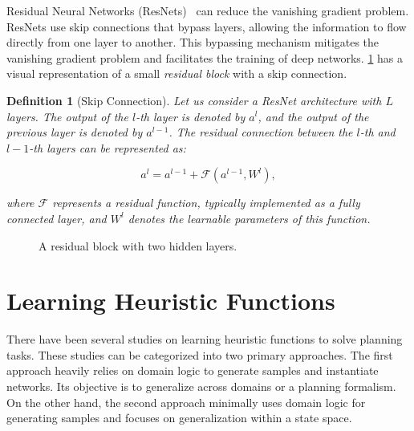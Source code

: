 \documentclass[ppgc,diss,english]{iiufrgs}
\newtheorem{definition}{Definition}
\begin{document}
Residual Neural Networks (ResNets)~\cite{He.etal/2016} can reduce the vanishing gradient problem. ResNets use skip connections that bypass layers, allowing the information to flow directly from one layer to another. This bypassing mechanism mitigates the vanishing gradient problem and facilitates the training of deep networks.
\cref{fig:residual-block} has a visual representation of a small \emph{residual block} with a skip connection.

\begin{definition}[Skip Connection]
Let us consider a ResNet architecture with $L$ layers. The output of the $l$-th layer is denoted by $a^{l}$, and the output of the previous layer is denoted by $a^{l-1}$. The residual connection between the $l$-th and $l-1$-th layers can be represented as:

$$a^{l} = a^{l-1} + \mathcal{F}(a^{l-1}, W^{l}),$$

where $\mathcal{F}$ represents a residual function, typically implemented as a fully connected layer, and $W^{l}$ denotes the learnable parameters of this function.
\end{definition}

\begin{figure}[tb]
\caption[A residual block]{A residual block with two hidden layers.}
\centering
{}
\label{fig:residual-block}
\end{figure}


\section{Learning Heuristic Functions}
\label{sec:related-h}
There have been several studies on learning heuristic functions to solve planning tasks. These studies can be categorized into two primary approaches.
The first approach heavily relies on domain logic to generate samples and instantiate networks. Its objective is to generalize across domains or a planning formalism.
On the other hand, the second approach minimally uses domain logic for generating samples and focuses on generalization within a state space.
\end{document}
